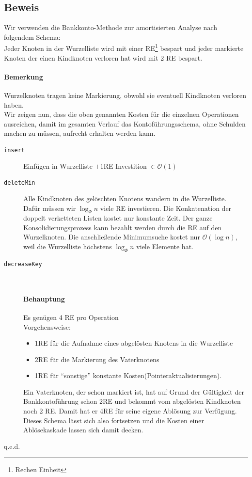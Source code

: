 \subsection{Beweis}
Wir verwenden die Bankkonto-Methode zur amortisierten Analyse nach folgendem Schema:\\
Jeder Knoten in der Wurzelliste wird mit einer RE\footnote{Rechen Einheit} bespart und jeder markierte Knoten der einen Kindknoten verloren hat wird mit 2 RE bespart.
\paragraph{Bemerkung}
Wurzelknoten tragen keine Markierung, obwohl sie eventuell Kindknoten verloren haben.\\

Wir zeigen nun, dass die oben genannten Kosten für die einzelnen Operationen ausreichen, damit im gesamten Verlauf das Kontoführungsschema, ohne Schulden machen zu müssen, aufrecht erhalten werden kann.\\
\begin{description}
	\item[\texttt{insert}] Einfügen in Wurzelliste $+1$RE Investition $\in\mathcal{O}(1)$\\
	\item[\texttt{deleteMin}] Alle Kindknoten des gelöschten Knotens wandern in die Wurzelliste.\\ Dafür müssen wir $\log_\Phi n$ viele RE investieren. Die Konkatenation der doppelt verketteten Listen kostet nur konstante Zeit. Der ganze Konsolidierungsprozess kann bezahlt werden durch die RE auf den Wurzelknoten. Die anschließende Minimumsuche kostet nur $\mathcal{O}(\log n)$, weil die Wurzelliste höchstens $\log_\Phi n$ viele Elemente hat.
	\item[\texttt{decreaseKey}] $ $
	\paragraph{Behauptung} Es genügen 4 RE pro Operation\\
	Vorgehensweise:
	\begin{itemize}
		\item 1RE für die Aufnahme eines abgelösten Knotens in die Wurzelliste
		\item 2RE für die Markierung des Vaterknotens
		\item 1RE für "`sonstige"' konstante Kosten(Pointeraktualisierungen).
	\end{itemize}
	Ein Vaterknoten, der schon markiert ist, hat auf Grund der Gültigkeit der Bankkontoführung schon 2RE und bekommt vom abgelösten Kindknoten noch 2 RE. Damit hat er 4RE für seine eigene Ablösung zur Verfügung. Dieses Schema lässt sich also fortsetzen und die Kosten einer Ablösekaskade lassen sich damit decken.
\end{description}
\begin{flushright}
	q.e.d.
\end{flushright}